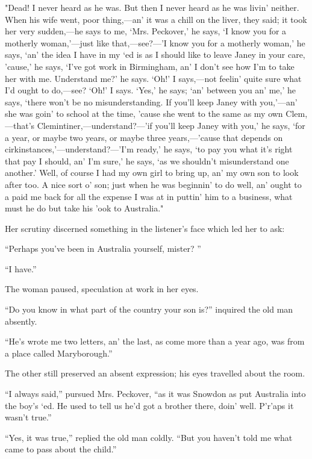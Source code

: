 "Dead! I never heard as he was. But then I never heard as he was livin'
neither. When his wife went, poor thing,---an' it was a chill on the
liver, they said; it took her very sudden,---he says to me, `Mrs.
Peckover,' he says, `I know you for a motherly woman,'---just like
that,---see?---'I know you for a motherly woman,' he says, `an' the idea
I have in my `ed is as I should like to leave Janey in your care,
'cause,' he says, `I've got work in Birmingham, an' I don't see how I'm
to take her with me. Understand me?' he says. `Oh!' I says,---not
feelin' quite sure what I'd ought to do,---see? `Oh!' I says. `Yes,' he
says; `an' between you an' me,' he says, `there won't be no
misunderstanding. If you'll keep Janey with you,'---an' she was goin' to
school at the time, 'cause {\protect\hypertarget{112}{}{}}she went to
the same as my own Clem,---that's Clemintiner,---understand?---'if
you'll keep Janey with you,' he says, `for a year, or maybe two years,
or maybe three years,---'cause that depends on
cirkinstances,'---understand?---'I'm ready,' he says, `to pay you what
it's right that pay I should, an' I'm sure,' he says, `as we shouldn't
misunderstand one another.' Well, of course I had my own girl to bring
up, an' my own son to look after too. A nice sort o' son; just when he
was beginnin' to do well, an' ought to a paid me back for all the
expense I was at in puttin' him to a business, what must he do but take
his 'ook to Australia."

Her scrutiny discerned something in the listener's face which led her to
ask:

``Perhaps you've been in Australia yourself, mister? ''

``I have.''

The woman paused, speculation at work in her eyes.

``Do you know in what part of the country your son is?'' inquired the
old man absently.

{\protect\hypertarget{113}{}{}}``He's wrote me two letters, an' the
last, as come more than a year ago, was from a place called
Maryborough.''

The other still preserved an absent expression; his eyes travelled about
the room.

``I always said,'' pursued Mrs. Peckover, ``as it was Snowdon as put
Australia into the boy's `ed. He used to tell us he'd got a brother
there, doin' well. P'r'aps it wasn't true.''

``Yes, it was true,'' replied the old man coldly. ``But you haven't told
me what came to pass about the child.''

